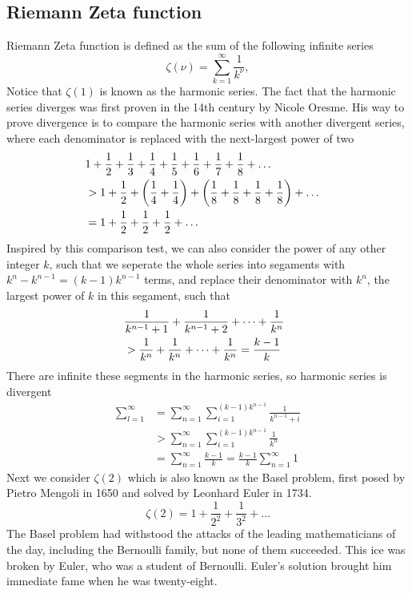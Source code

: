 \documentclass[10pt]{article}
\begin{document}
\subsection{Riemann Zeta function}

Riemann Zeta function is defined as the sum of the following infinite series
\begin{equation}
	\zeta(\nu) = \sum_{k=1}^{\infty} \frac{1}{k^{\nu}},
\end{equation}
Notice that $\zeta(1)$ is known as the harmonic series. The fact that the harmonic series diverges was first proven in the 14th century by Nicole Oresme. His way to prove divergence is to compare the harmonic series with another divergent series, where each denominator is replaced with the next-largest power of two
\begin{align*}
	\lefteqn{1 + \frac{1}{2} + \frac{1}{3} + \frac{1}{4} + \frac{1}{5} + \frac{1}{6} + \frac{1}{7} + \frac{1}{8} + \dots} \\
	&> 1 + \frac{1}{2} + \left(\frac{1}{4} + \frac{1}{4}\right) + \left(\frac{1}{8} + \frac{1}{8} + \frac{1}{8} + \frac{1}{8}\right) + \dots \\
	&= 1 + \frac{1}{2} + \frac{1}{2} + \frac{1}{2} + \dots
\end{align*}
Inspired by this comparison test, we can also consider the power of any other integer $k$, such that we seperate the whole series into segaments with $k^{n} - k^{n-1} = (k-1)k^{n-1}$ terms, and replace their denominator with $k^{n}$, the largest power of $k$ in this segament, such that
\begin{align*}
	\lefteqn{\frac{1}{k^{n-1} +1} + \frac{1}{k^{n-1} + 2} + \dots + \frac{1}{k^n}}\\
	&> \frac{1}{k^n} + \frac{1}{k^n} + \dots + \frac{1}{k^n} = \frac{k-1}{k}
\end{align*}
There are infinite these segments in the harmonic series, so harmonic series is divergent
\begin{align*}
	\sum_{l=1}^{\infty} &= \sum_{n=1}^{\infty} \sum_{i=1}^{(k-1)k^{n-1}} \frac{1}{k^{n-1} + i}\\
	&> \sum_{n=1}^{\infty} \sum_{i=1}^{(k-1)k^{n-1}} \frac{1}{k^n} \\
	&= \sum_{n=1}^{\infty} \frac{k-1}{k} = \frac{k-1}{k} \sum_{n=1}^{\infty} 1
\end{align*}
Next we consider $\zeta(2)$ which is also known as the Basel problem, first posed by Pietro Mengoli in 1650 and solved by Leonhard Euler in 1734.
\begin{equation}
	\zeta(2) = 1 + \frac{1}{2^2} + \frac{1}{3^2} + \dots
\end{equation}
The Basel problem had withstood the attacks of the leading mathematicians of the day, including the Bernoulli family, but none of them succeeded. This ice was broken by Euler, who was a student of Bernoulli. Euler's solution brought him immediate fame when he was twenty-eight.
\end{document}
